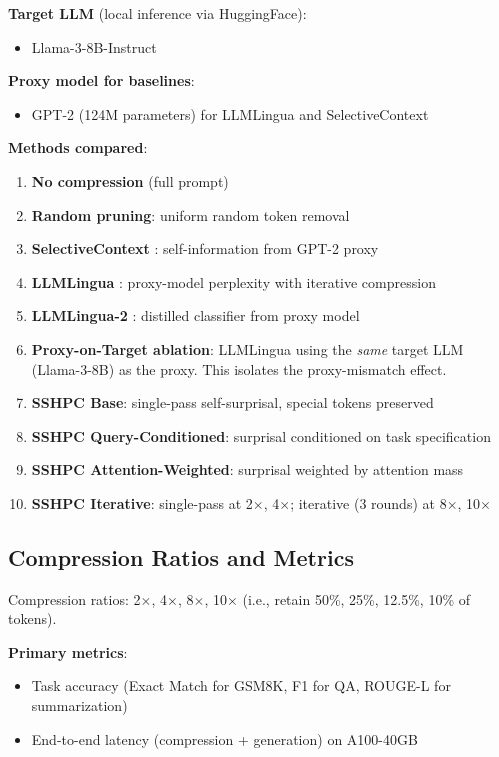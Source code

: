 \documentclass[11pt,letterpaper]{article}
\begin{document}
\textbf{Target LLM} (local inference via HuggingFace):
\begin{itemize}
  \item Llama-3-8B-Instruct
\end{itemize}

\textbf{Proxy model for baselines}:
\begin{itemize}
  \item GPT-2 (124M parameters) for LLMLingua and SelectiveContext
\end{itemize}

\textbf{Methods compared}:
\begin{enumerate}
  \item \textbf{No compression} (full prompt)
  \item \textbf{Random pruning}: uniform random token removal
  \item \textbf{SelectiveContext} \citep{Li2023}: self-information from GPT-2 proxy
  \item \textbf{LLMLingua} \citep{Jiang2023}: proxy-model perplexity with iterative compression
  \item \textbf{LLMLingua-2} \citep{Pan2024}: distilled classifier from proxy model
  \item \textbf{Proxy-on-Target ablation}: LLMLingua using the \textit{same} target LLM (Llama-3-8B) as the proxy. This isolates the proxy-mismatch effect.
  \item \textbf{SSHPC Base}: single-pass self-surprisal, special tokens preserved
  \item \textbf{SSHPC Query-Conditioned}: surprisal conditioned on task specification
  \item \textbf{SSHPC Attention-Weighted}: surprisal weighted by attention mass
  \item \textbf{SSHPC Iterative}: single-pass at 2$\times$, 4$\times$; iterative (3 rounds) at 8$\times$, 10$\times$
\end{enumerate}

\subsection{Compression Ratios and Metrics}

Compression ratios: 2$\times$, 4$\times$, 8$\times$, 10$\times$ (i.e., retain 50\%, 25\%, 12.5\%, 10\% of tokens).

\textbf{Primary metrics}:
\begin{itemize}
  \item Task accuracy (Exact Match for GSM8K, F1 for QA, ROUGE-L for summarization)
  \item End-to-end latency (compression + generation) on A100-40GB
\end{itemize}
\end{document}
